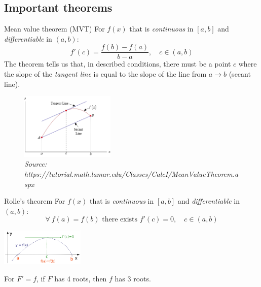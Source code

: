 \subsection{Important theorems}
\begin{theorem}
    {Mean value theorem (MVT)}
    For $f(x)$ that is \emph{continuous} in $[a,b]$ and \emph{differentiable} in $(a,b)$:
    \[f'(c)=\frac{f(b)-f(a)}{b-a},\quad c\in(a,b)\]
    \tcblower
    The theorem tells us that, in described conditions, there must be a point $c$ where the slope of the \emph{tangent line} is equal to the slope of the line from $a\to b$ (secant line).
    \begin{figure}[H]
        \centering
        \includegraphics[width=0.4\textwidth]{./img/mvt.png}
        \caption*{\tiny\textit{\color{gray}Source: https://tutorial.math.lamar.edu/Classes/CalcI/MeanValueTheorem.aspx}}
    \end{figure}
\end{theorem}
\begin{theorem}
    {Rolle's theorem}
    For $f(x)$ that is \emph{continuous} in $[a,b]$ and \emph{differentiable} in $(a,b)$:
    \[\forall\ f(a)=f(b)\text{  there exists  }f'(c)=0,\quad c\in(a,b)\]
    \begin{center}
        \includegraphics[width=0.3\textwidth]{./img/rt.png}
    \end{center}
    \tcblower
    For $F'=f$, if $F$ has 4 roots, then $f$ has 3 roots.
\end{theorem}


